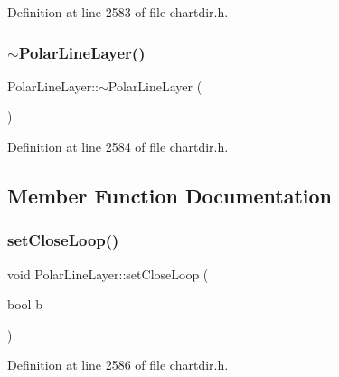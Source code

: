 Definition at line 2583 of file chartdir.\+h.

\mbox{\label{class_polar_line_layer_a582d7c1441855106bc5f7000d2ea1cf7}} 
\subsubsection{\texorpdfstring{$\sim$\+Polar\+Line\+Layer()}{~PolarLineLayer()}}
{\footnotesize\ttfamily Polar\+Line\+Layer\+::$\sim$\+Polar\+Line\+Layer (\begin{DoxyParamCaption}{ }\end{DoxyParamCaption})\hspace{0.3cm}{\ttfamily [inline]}}



Definition at line 2584 of file chartdir.\+h.



\subsection{Member Function Documentation}
\mbox{\label{class_polar_line_layer_a2d55cd0511bd1d9f61ab9668e3feaffc}} 
\subsubsection{\texorpdfstring{set\+Close\+Loop()}{setCloseLoop()}}
{\footnotesize\ttfamily void Polar\+Line\+Layer\+::set\+Close\+Loop (\begin{DoxyParamCaption}\item[{bool}]{b }\end{DoxyParamCaption})\hspace{0.3cm}{\ttfamily [inline]}}



Definition at line 2586 of file chartdir.\+h.

